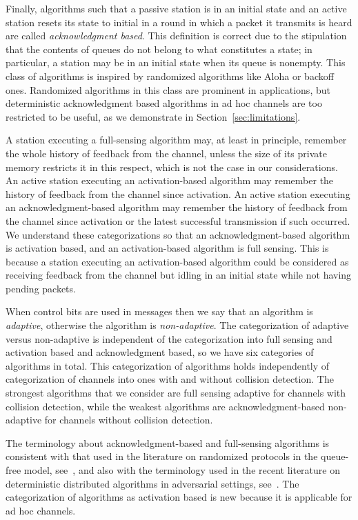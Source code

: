 \documentclass[11pt]{article}
\begin{document}
Finally, algorithms such that a passive station is in an initial state and an active station resets its state to initial in a round in which a packet it transmits is heard are called \emph{acknowledgment based}.
This definition is correct due to the stipulation that the contents of queues do not belong to what constitutes a state; in particular, a station may be in an initial state when its queue is nonempty.
This class of algorithms is inspired by randomized algorithms like Aloha or backoff ones.
Randomized algorithms in this class are prominent in applications, but deterministic acknowledgment based algorithms in ad hoc channels are too restricted to be useful, as we demonstrate in Section~\ref{sec:limitations}.

A station executing a full-sensing algorithm may, at least in principle, remember the whole history of feedback from the channel, unless the size of its private memory restricts it in this respect, which is not the case in our considerations.
An active station executing an activation-based algorithm may remember the history of  feedback from the channel since activation.
An active station executing an acknowledgment-based algorithm may remember the history of feedback from the channel since activation or the latest successful transmission if such occurred.
We understand these categorizations so that an acknowledgment-based algorithm is activation based, and an activation-based algorithm is full sensing.
This is because a station executing an activation-based algorithm could be considered as receiving feedback from the channel but idling in an initial state while not having pending packets.

When control bits are used in messages then we say that an algorithm is \emph{adaptive}, otherwise the algorithm is \emph{non-adaptive}.
The categorization of adaptive versus non-adaptive is independent of the categorization into full sensing and activation based and acknowledgment based, so we have six categories of algorithms in total.
This categorization of algorithms holds independently of categorization of  channels into ones with and without collision detection.
The strongest algorithms that we consider are full sensing adaptive for channels with collision detection, while the weakest algorithms are acknowledgment-based non-adaptive for channels without collision detection.



The terminology about acknowledgment-based and full-sensing algorithms is consistent with that used in the literature on randomized protocols in the queue-free model, see~\cite{Gallager-TIT85}, and also with the terminology used in the recent literature on deterministic distributed algorithms in adversarial settings, see~\cite{AnantharamuCKR-INFOCOM10,AnantharamuCKR-SIROCCO11, AnantharamuCR-OPODIS09, ChlebusKR09,ChlebusKR-TALG12}.
The categorization of algorithms as activation based is new because it is applicable for ad hoc channels.
\end{document}
